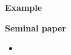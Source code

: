 \begin{frame}\begin{center}
\LARGE\textbf{Example}
\end{center}\end{frame}
\begin{frame}\textbf{Seminal paper}\vspace{0.3cm}

\begin{itemize}\setlength\itemsep{1em}
  \item {}
\end{itemize}
\end{frame}


